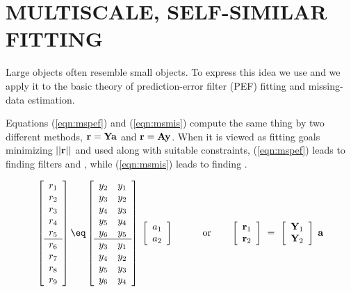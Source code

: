 \section{MULTISCALE, SELF-SIMILAR FITTING}

Large objects often resemble small objects.
To express this idea we use {\it {}}
and we apply it to the basic theory
of prediction-error filter (PEF) fitting
and missing-data estimation.
\par
Equations (\ref{eqn:mspef}) and (\ref{eqn:msmis}) compute the same thing
by two different methods,
$ \bold r = \bold Y \bold a$ and
$ \bold r = \bold A \bold y$.
When it is viewed as fitting goals minimizing $||\bold r||$
and used along with suitable constraints,
(\ref{eqn:mspef}) leads to finding filters and ,
while
(\ref{eqn:msmis}) leads to finding .

\begin{equation}
\left[ 
\begin{array}{c}
  r_1 \\ 
  r_2 \\ 
  r_3 \\ 
  r_4 \\ 
  r_5 \\ 
  \hline
  r_6 \\
  r_7 \\
  r_8 \\
  r_9
  \end{array} \right] 
\eq
\left[ 
\begin{array}{ccc}
  y_2 & y_1 \\
  y_3 & y_2 \\
  y_4 & y_3 \\
  y_5 & y_4 \\
  y_6 & y_5 \\
  \hline
  y_3 & y_1 \\
  y_4 & y_2 \\
  y_5 & y_3 \\
  y_6 & y_4 
  \end{array} \right] 
\; \left[ 
\begin{array}{c}
  a_1 \\ 
  a_2 \end{array} \right]
\quad\quad\quad {\rm or}\quad\quad
\left[ 
\begin{array}{c}
  \bold r_1 \\ 
  \bold r_2
  \end{array} \right] 
\ =\ 
\left[ 
\begin{array}{c}
  \bold Y_1 \\
  \bold Y_2
  \end{array} \right] 
\;
\bold a
\label{eqn:mspef}
\end{equation}

